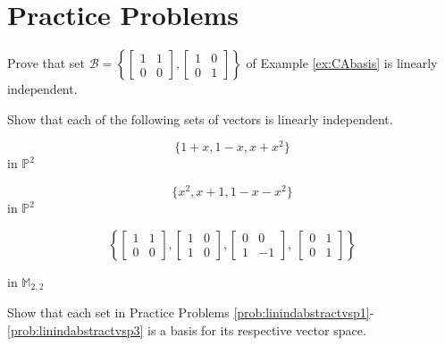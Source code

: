 \documentclass{ximera}
\begin{document}
\section*{Practice Problems}
\begin{problem}\label{prob:CABlinind}
Prove that set $\mathcal{B}=\left\{\begin{bmatrix}1&1\\0&0\end{bmatrix},\begin{bmatrix}1&0\\0&1\end{bmatrix}\right\}$ of Example \ref{ex:CAbasis} is linearly independent.
\end{problem}

\begin{problem}
Show that each of the following sets of vectors is linearly independent.

\begin{problem}\label{prob:linindabstractvsp1}
$$\{1 + x, 1 - x, x + x^{2}\}$$ in $\mathbb{P}^{2}$
\end{problem}

\begin{problem}\label{prob:linindabstractvsp2}
$$\{x^{2}, x + 1, 1 - x - x^{2}\}$$ in $\mathbb{P}^{2}$
\end{problem}

\begin{problem}\label{prob:linindabstractvsp3}
$$
\left\{
\begin{bmatrix}
1 & 1 \\
0 & 0
\end{bmatrix}
, 
\begin{bmatrix}
1 & 0 \\
1 & 0
\end{bmatrix}
, 
\begin{bmatrix}
0 & 0 \\
1 & -1
\end{bmatrix}
,\
\begin{bmatrix}
0 & 1 \\
0 & 1
\end{bmatrix}
\right\}$$ 

in $\mathbb{M}_{2,2}$
\end{problem}

\end{problem}

\begin{problem}\label{prob:linindabstractvsp123}
Show that each set in Practice Problems \ref{prob:linindabstractvsp1}-\ref{prob:linindabstractvsp3} is a basis for its respective vector space.
\end{problem}
\end{document}
